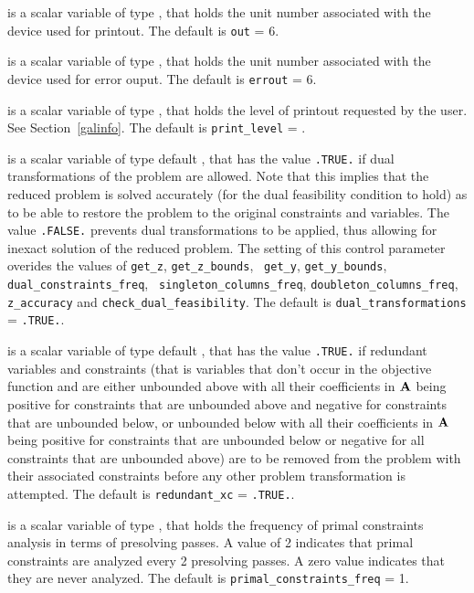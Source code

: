 \documentclass{galahad}
\newcommand{\sym}{\tt\small}
\begin{document}
\begin{description}
 is a scalar variable of type \integer, that holds the
unit number associated with the device used for printout.
The default is {\tt out} = 6.

 is a scalar variable of type \integer, that holds the
unit number associated with the device used for error ouput.
The default is {\tt errout} = 6.

 is a scalar variable of type \integer, that holds the
level of printout requested by the user. See Section~\ref{galinfo}.
The default is {\tt print\_level} = {\sym \galsymsilent}.

 is a scalar variable of type default \logical,
that has the value {\tt .TRUE.} if dual transformations of the problem are
allowed. Note that this implies that the reduced problem is solved
accurately (for the dual feasibility condition to hold)
as to be able to restore the problem to the original
constraints and variables. The value {\tt .FALSE.} prevents dual
transformations to be applied, thus allowing for inexact
solution of the reduced problem. The setting of this control
parameter overides the values of {\tt get\_z}, {\tt get\_z\_bounds}, {\tt
get\_y}, {\tt get\_y\_bounds}, {\tt dual\_constraints\_freq}, {\tt
singleton\_columns\_freq}, {\tt doubleton\_columns\_freq}, {\tt z\_accuracy}
and {\tt  check\_dual\_feasibility}.
The default is {\tt dual\_transformations} = {\tt .TRUE.}.

 is a scalar variable of type default \logical,
that has the value {\tt .TRUE.} if redundant variables and constraints
(that is variables that don't occur in the objective function and are
either unbounded above with all their coefficients in ${\mathbf{A}}$
being positive for constraints that are unbounded above and negative for
constraints that are unbounded below, or unbounded below
with all their coefficients in ${\mathbf{A}}$ being positive for constraints that are
unbounded below or negative for all constraints that are unbounded above)
are to be removed from the problem with their associated constraints before
any other problem transformation is attempted.
The default is {\tt redundant\_xc} = {\tt .TRUE.}.

 is a scalar variable of type \integer,
that holds the  frequency of primal constraints analysis in terms of
presolving passes.  A value of 2 indicates that primal
constraints are analyzed every 2 presolving passes. A zero
value indicates that they are never analyzed.
The default is {\tt primal\_constraints\_freq} = 1.


\end{description}
\end{document}
